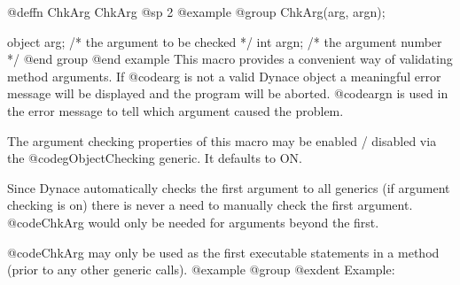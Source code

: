 @deffn {ChkArg} ChkArg
@sp 2
@example
@group
ChkArg(arg, argn);

object  arg;    /*  the argument to be checked  */
int     argn;   /*  the argument number         */
@end group
@end example
This macro provides a convenient way of validating method arguments.
If @code{arg} is not a valid Dynace object a meaningful error message
will be displayed and the program will be aborted.  @code{argn} is
used in the error message to tell which argument caused the problem.

The argument checking properties of this macro may be enabled / disabled
via the @code{gObjectChecking} generic.  It defaults to ON.

Since Dynace automatically checks the first argument to all generics (if
argument checking is on) there is never a need to manually check the
first argument.  @code{ChkArg} would only be needed for arguments
beyond the first.

@code{ChkArg} may only be used as the first executable statements in a
method (prior to any other generic calls).
@example
@group
@exdent Example:

